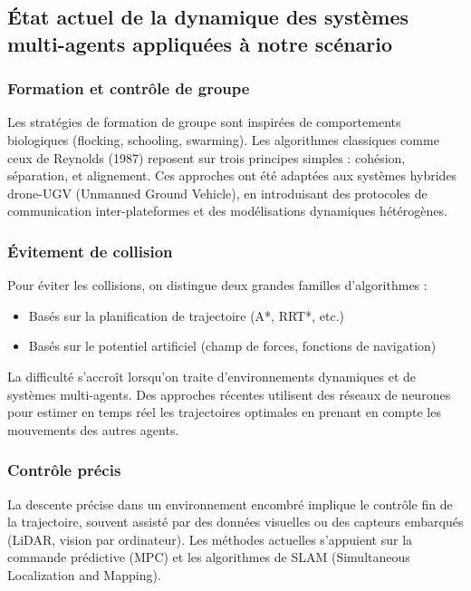 \documentclass[a4paper,12pt]{article}
\begin{document}
\subsection*{État actuel de la dynamique des systèmes multi-agents appliquées à notre scénario} 

\subsubsection*{Formation et contrôle de groupe}

Les stratégies de formation de groupe sont inspirées de comportements biologiques (flocking, schooling, swarming). Les algorithmes classiques comme ceux de Reynolds (1987) reposent sur trois principes simples : cohésion, séparation, et alignement. Ces approches ont été adaptées aux systèmes hybrides drone-UGV (Unmanned Ground Vehicle), en introduisant des protocoles de communication inter-plateformes et des modélisations dynamiques hétérogènes.

\subsubsection*{Évitement de collision}

Pour éviter les collisions, on distingue deux grandes familles d’algorithmes :
\begin{itemize}
    \item Basés sur la planification de trajectoire (A*, RRT*, etc.)
    \item Basés sur le potentiel artificiel (champ de forces, fonctions de navigation)
\end{itemize}

La difficulté s’accroît lorsqu’on traite d’environnements dynamiques et de systèmes multi-agents. Des approches récentes utilisent des réseaux de neurones pour estimer en temps réel les trajectoires optimales en prenant en compte les mouvements des autres agents.

\subsubsection*{Contrôle précis}

La descente précise dans un environnement encombré implique le contrôle fin de la trajectoire, souvent assisté par des données visuelles ou des capteurs embarqués (LiDAR, vision par ordinateur). Les méthodes actuelles s’appuient sur la commande prédictive (MPC) et les algorithmes de SLAM (Simultaneous Localization and Mapping).
\end{document}
